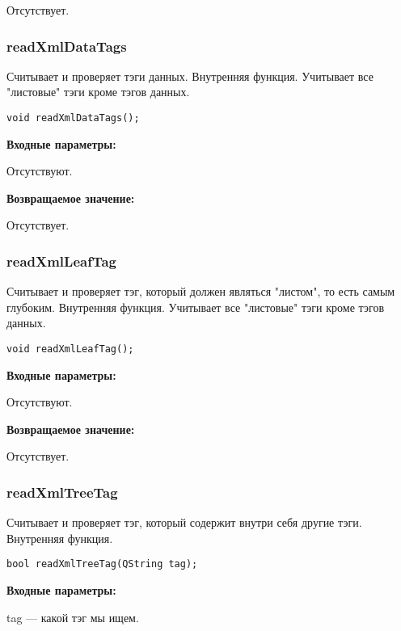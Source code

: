 Отсутствует.


\subsubsection{readXmlDataTags}\label{readXmlDataTags}

Считывает и проверяет тэги данных. Внутренняя функция. Учитывает все "листовые" тэги кроме тэгов данных.


\begin{lstlisting}[label=code_syntax_readXmlDataTags,caption=Синтаксис]
void readXmlDataTags();
\end{lstlisting}

\textbf{Входные параметры:}

Отсутствуют.

\textbf{Возвращаемое значение:}

Отсутствует.


\subsubsection{readXmlLeafTag}\label{readXmlLeafTag}

Считывает и проверяет тэг, который должен являться "листом", то есть самым глубоким. Внутренняя функция. Учитывает все "листовые" тэги кроме тэгов данных.


\begin{lstlisting}[label=code_syntax_readXmlLeafTag,caption=Синтаксис]
void readXmlLeafTag();
\end{lstlisting}

\textbf{Входные параметры:}

Отсутствуют.

\textbf{Возвращаемое значение:}

Отсутствует.


\subsubsection{readXmlTreeTag}\label{readXmlTreeTag}

Считывает и проверяет тэг, который содержит внутри себя другие тэги. Внутренняя функция.


\begin{lstlisting}[label=code_syntax_readXmlTreeTag,caption=Синтаксис]
bool readXmlTreeTag(QString tag);
\end{lstlisting}

\textbf{Входные параметры:}

tag --- какой тэг мы ищем.

